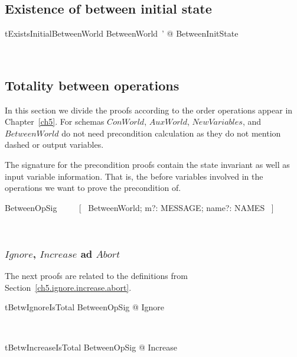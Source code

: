 \subsection{Existence of between initial state}\label{ch8.specproof-betw-init}

\begin{LThm}
\begin{theorem}{tExistsInitialBetweenWorld}
  \exists BetweenWorld~' @ BetweenInitState
\end{theorem}~\end{LThm}

\subsection{Totality between operations}\label{ch8.specproof-betw-total}

In this section we divide the proofs according to the order operations appear
in Chapter~\ref{ch5}. For schemas $ConWorld$, $AuxWorld$, $NewVariables$, and
$BetweenWorld$ do not need precondition calculation as they do not mention
dashed or output variables.

The signature for the precondition proofs contain the state invariant as well
as input variable information. That is, the before variables involved in the
operations we want to prove the precondition of.
%
\begin{LNewSDef}
\begin{zed}
   BetweenOpSig ~~~~ [~ BetweenWorld; m?: MESSAGE; name?: NAMES ~]
\end{zed}~\end{LNewSDef}

\subsubsection{$Ignore$, $Increase$ ad $Abort$}

The next proofs are related to the definitions from Section~\ref{ch5.ignore.increase.abort}.

\begin{LNewThm}
\begin{theorem}{tBetwIgnoreIsTotal}
   \forall BetweenOpSig @ \pre Ignore
\end{theorem}~\end{LNewThm}

\begin{LNewThm}
\begin{theorem}{tBetwIncreaseIsTotal}
   \forall BetweenOpSig @ \pre Increase
\end{theorem}~\end{LNewThm}

